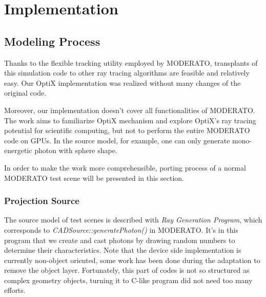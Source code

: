 
\chapter{Implementation} %

\label{Chapter4} %



\section{Modeling Process}
Thanks to the flexible tracking utility employed by MODERATO, transplants of this simulation code to other ray tracing algorithms are feasible and relatively easy. Our OptiX implementation was realized without many changes of the original code. 

Moreover, our implementation doesn't cover all functionalities of MODERATO. The work aims to familiarize OptiX mechanism and explore OptiX's ray tracing potential for scientific computing, but not to perform the entire MODERATO code on GPUs. In the source model, for example, one can only generate mono-energetic photon with sphere shape.

In order to make the work more comprehensible, porting process of a normal MODERATO test scene will be presented in this section.


\subsection{Projection Source}
The source model of test scenes is described with \textit{Ray Generation Program}, which corresponds to \textit{CADSource::generatePhoton()} in MODERATO. It's in this program that we create and cast photons by drawing random numbers to determine their characteristics. Note that the device side implementation is currently non-object oriented, some work has been done during the adaptation to remove the object layer. Fortunately, this part of codes is not so structured as complex geometry objects, turning it to C-like program did not need too many efforts.


